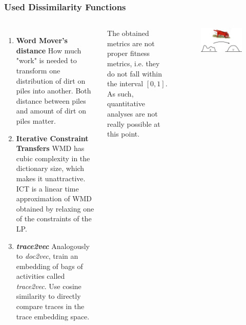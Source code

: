\documentclass{beamer}
\begin{document}
	
	\begin{frame}
		\frametitle{Used Dissimilarity Functions}
\begin{columns}[t]
		\begin{enumerate}
			\item \textbf{Word Mover's distance} \cite{KSKW15} How much "work" is needed to transform one distribution of dirt on piles into another. Both distance between piles and amount of dirt on piles matter.
			\item \textbf{Iterative Constraint Transfers} \cite{AtMi18} WMD has cubic complexity in the dictionary size, which makes it unattractive. ICT is a linear time approximation of WMD obtained by relaxing one of the constraints of the LP.
			\item \textbf{\emph{trace2vec}} \cite{KBWe18} Analogously to \emph{doc2vec}, train an embedding of bags of activities called \emph{trace2vec}. Use cosine similarity to directly compare traces in the trace embedding space.
		\end{enumerate}
	\alert{The obtained metrics are not proper fitness metrics, i.e. they do not fall within the interval $[0,1]$. As such, quantitative analyses are not really possible at this point.}
	\begin{figure}
		\includegraphics[width=1\linewidth, keepaspectratio]{figures/emd}
	\end{figure}
\end{columns}
	\end{frame}
	
\end{document}
